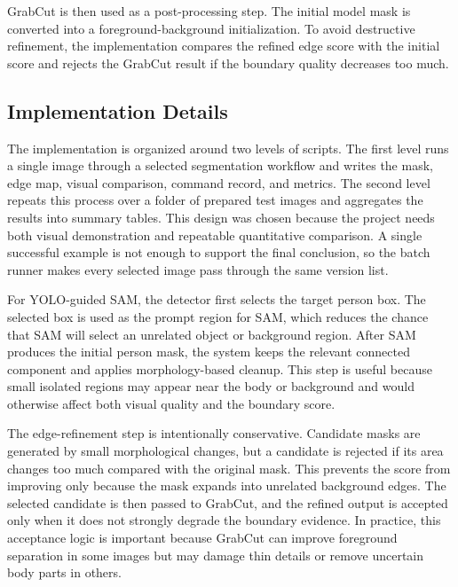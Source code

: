 \documentclass[conference]{IEEEtran}
\begin{document}
GrabCut is then used as a post-processing step. The initial model mask is converted into a foreground-background initialization. To avoid destructive refinement, the implementation compares the refined edge score with the initial score and rejects the GrabCut result if the boundary quality decreases too much.

\subsection{Implementation Details}
The implementation is organized around two levels of scripts. The first level runs a single image through a selected segmentation workflow and writes the mask, edge map, visual comparison, command record, and metrics. The second level repeats this process over a folder of prepared test images and aggregates the results into summary tables. This design was chosen because the project needs both visual demonstration and repeatable quantitative comparison. A single successful example is not enough to support the final conclusion, so the batch runner makes every selected image pass through the same version list.

For YOLO-guided SAM, the detector first selects the target person box. The selected box is used as the prompt region for SAM, which reduces the chance that SAM will select an unrelated object or background region. After SAM produces the initial person mask, the system keeps the relevant connected component and applies morphology-based cleanup. This step is useful because small isolated regions may appear near the body or background and would otherwise affect both visual quality and the boundary score.

The edge-refinement step is intentionally conservative. Candidate masks are generated by small morphological changes, but a candidate is rejected if its area changes too much compared with the original mask. This prevents the score from improving only because the mask expands into unrelated background edges. The selected candidate is then passed to GrabCut, and the refined output is accepted only when it does not strongly degrade the boundary evidence. In practice, this acceptance logic is important because GrabCut can improve foreground separation in some images but may damage thin details or remove uncertain body parts in others.
\end{document}
